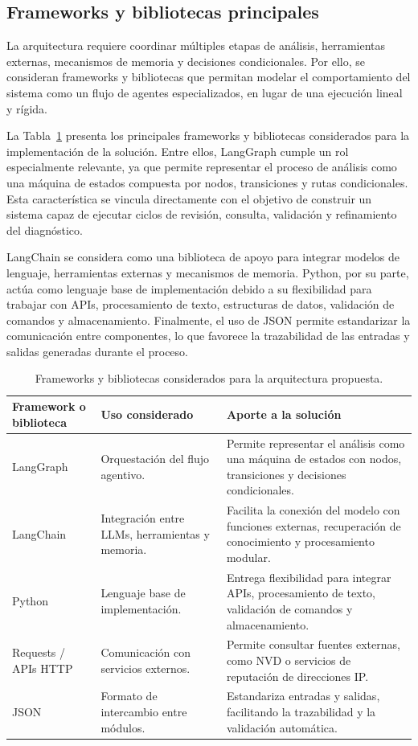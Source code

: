 \subsection{Frameworks y bibliotecas principales}

La arquitectura requiere coordinar múltiples etapas de análisis, herramientas externas, mecanismos de memoria y decisiones condicionales. Por ello, se consideran frameworks y bibliotecas que permitan modelar el comportamiento del sistema como un flujo de agentes especializados, en lugar de una ejecución lineal y rígida.

La Tabla~\ref{tab:frameworks_bibliotecas} presenta los principales frameworks y bibliotecas considerados para la implementación de la solución. Entre ellos, LangGraph cumple un rol especialmente relevante, ya que permite representar el proceso de análisis como una máquina de estados compuesta por nodos, transiciones y rutas condicionales. Esta característica se vincula directamente con el objetivo de construir un sistema capaz de ejecutar ciclos de revisión, consulta, validación y refinamiento del diagnóstico.

LangChain se considera como una biblioteca de apoyo para integrar modelos de lenguaje, herramientas externas y mecanismos de memoria. Python, por su parte, actúa como lenguaje base de implementación debido a su flexibilidad para trabajar con APIs, procesamiento de texto, estructuras de datos, validación de comandos y almacenamiento. Finalmente, el uso de JSON permite estandarizar la comunicación entre componentes, lo que favorece la trazabilidad de las entradas y salidas generadas durante el proceso.

\begin{table}[H]
\centering
\caption{Frameworks y bibliotecas considerados para la arquitectura propuesta.}
\label{tab:frameworks_bibliotecas}
\renewcommand{\arraystretch}{1.25}
\begin{tabularx}{\textwidth}{p{2.4cm} X X}
\toprule
\textbf{Framework o biblioteca} & \textbf{Uso considerado} & \textbf{Aporte a la solución} \\
\midrule
LangGraph & Orquestación del flujo agentivo. & Permite representar el análisis como una máquina de estados con nodos, transiciones y decisiones condicionales. \\
\midrule
LangChain & Integración entre LLMs, herramientas y memoria. & Facilita la conexión del modelo con funciones externas, recuperación de conocimiento y procesamiento modular. \\
\midrule
Python & Lenguaje base de implementación. & Entrega flexibilidad para integrar APIs, procesamiento de texto, validación de comandos y almacenamiento. \\
\midrule
Requests / APIs HTTP & Comunicación con servicios externos. & Permite consultar fuentes externas, como NVD o servicios de reputación de direcciones IP. \\
\midrule
JSON & Formato de intercambio entre módulos. & Estandariza entradas y salidas, facilitando la trazabilidad y la validación automática. \\
\bottomrule
\end{tabularx}
\end{table}



